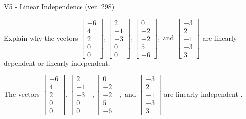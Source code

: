\begin{exercise}
  \begin{exerciseTitle}V5 - Linear Independence (ver. 298)\end{exerciseTitle}
  \begin{exerciseStatement}
    Explain why the vectors \(\left[\begin{array}{r}
-6 \\
4 \\
2 \\
0 \\
0
\end{array}\right] , \left[\begin{array}{r}
2 \\
-1 \\
-3 \\
0 \\
0
\end{array}\right] , \left[\begin{array}{r}
0 \\
-2 \\
-2 \\
5 \\
-6
\end{array}\right] , \text{ and } \left[\begin{array}{r}
-3 \\
2 \\
-1 \\
-3 \\
3
\end{array}\right]\) are linearly dependent or linearly independent.	


  \end{exerciseStatement}
  \begin{exerciseAnswer}
   The vectors \(\left[\begin{array}{r}
-6 \\
4 \\
2 \\
0 \\
0
\end{array}\right] , \left[\begin{array}{r}
2 \\
-1 \\
-3 \\
0 \\
0
\end{array}\right] , \left[\begin{array}{r}
0 \\
-2 \\
-2 \\
5 \\
-6
\end{array}\right] , \text{ and } \left[\begin{array}{r}
-3 \\
2 \\
-1 \\
-3 \\
3
\end{array}\right]\) are 
  	 linearly independent  .
  


  \end{exerciseAnswer}
\end{exercise}